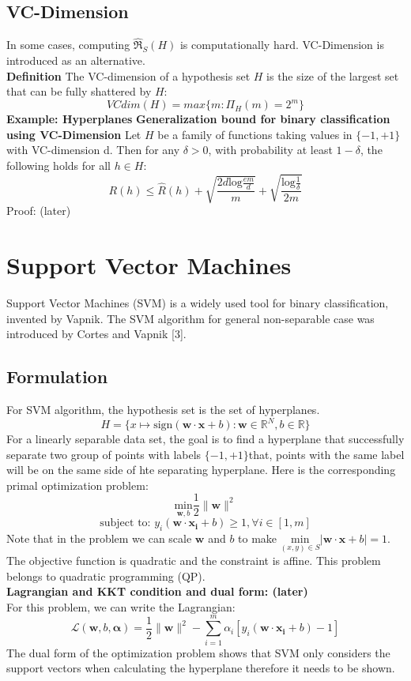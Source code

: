 \documentclass[12pt]{article}
\theoremstyle{definition}
\theoremstyle{remark}
\numberwithin{equation}{section}
\begin{document}
\subsection{VC-Dimension}
In some cases, computing $\mathfrak{\widehat{R}}_S(H)$ is computationally hard. VC-Dimension is introduced as an alternative. \\[0.2cm]
\textbf{Definition}
The VC-dimension of a hypothesis set $H$ is the size of the largest set that can be fully shattered by $H$:
\[VCdim(H) = max\{m:\Pi_H(m) = 2^m\}\]
\textbf{Example: Hyperplanes}
\textbf{Generalization bound for binary classification using VC-Dimension}
Let $H$ be a family of functions taking values in $\{-1,+1\}$ with VC-dimension d. Then for any $\delta > 0$, with probability at least $1-\delta$, the following holds for all $h \in H$:
\[R(h) \leq \widehat{R}(h) + \sqrt{\frac{2d\mathrm{log}\frac{em}{d}}{m}} + \sqrt{\frac{\mathrm{log}\frac{1}{\delta}}{2m}}\]
Proof: (later)
\section{Support Vector Machines}
Support Vector Machines (SVM) is a widely used tool for binary classification, invented by Vapnik. The SVM algorithm for general non-separable case was introduced by Cortes and Vapnik [3].
\subsection{Formulation}
For SVM algorithm, the hypothesis set is the set of hyperplanes.
\[H = \{x\mapsto \mathrm{sign}(\mathbf{w\cdot x}+b): \mathbf{w} \in \mathbb{R}^N, b \in \mathbb{R} \}\]
For a linearly separable data set, the goal is to find a hyperplane that successfully separate two group of points with labels $\{-1,+1\}$that, points with the same label will be on the same side of hte separating hyperplane. Here is the corresponding primal optimization problem:
\[\underset{\mathbf{w}, b}{\mathrm{min}} \frac{1}{2}\|\mathbf{w}\|^2\]
\[\text{subject to: } y_i(\mathbf{w\cdot x_i}+b) \geq 1, \forall i \in [1,m]\]
Note that in the problem we can scale $\mathbf{w}$ and $b$ to make $\underset{(x,y)\in S}{\mathrm{min}}|\mathbf{w\cdot x}+b| =1 $.
The objective function is quadratic and the constraint is affine. This problem belongs to quadratic programming (QP). \\[0.2cm]
\textbf{Lagrangian and KKT condition and dual form: (later)} \\[0.2cm]
For this problem, we can write the Lagrangian:
\[\mathcal{L}(\mathbf{w},b,\mathbf{\alpha})=\frac{1}{2}\|\mathbf{w}\|^2-\sum_{i=1}^{m}\alpha_i [y_i(\mathbf{w\cdot x_i}+b)-1]\]
The dual form of the optimization problem shows that SVM only considers the support vectors when calculating the hyperplane therefore it needs to be shown.
\end{document}
